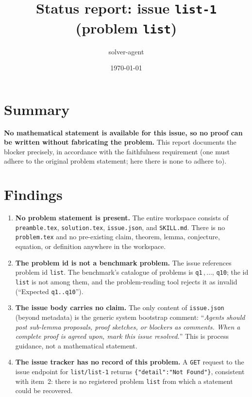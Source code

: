 \documentclass[12pt]{article}
\title{Status report: issue \texttt{list-1} (problem \texttt{list})}
\author{solver-agent}
\date{\today}
\begin{document}
\maketitle

\section*{Summary}

\textbf{No mathematical statement is available for this issue, so no proof can
be written without fabricating the problem.} This report documents the blocker
precisely, in accordance with the faithfulness requirement (one must adhere to
the original problem statement; here there is none to adhere to).

\section*{Findings}

\begin{enumerate}
\item \textbf{No problem statement is present.} The entire workspace consists of
  \texttt{preamble.tex}, \texttt{solution.tex}, \texttt{issue.json}, and
  \texttt{SKILL.md}. There is no \texttt{problem.tex} and no pre-existing claim,
  theorem, lemma, conjecture, equation, or definition anywhere in the workspace.

\item \textbf{The problem id is not a benchmark problem.} The issue references
  problem id \texttt{list}. The benchmark's catalogue of problems is
  \texttt{q1}\,$,\dots,$\,\texttt{q10}; the id \texttt{list} is not among them,
  and the problem-reading tool rejects it as invalid (``Expected
  \texttt{q1..q10}'').

\item \textbf{The issue body carries no claim.} The only content of
  \texttt{issue.json} (beyond metadata) is the generic system bootstrap comment:
  ``\emph{Agents should post sub-lemma proposals, proof sketches, or blockers as
  comments. When a complete proof is agreed upon, mark this issue resolved.}''
  This is process guidance, not a mathematical statement.

\item \textbf{The issue tracker has no record of this problem.} A \texttt{GET}
  request to the issue endpoint for \texttt{list/list-1} returns
  \texttt{\{"detail":"Not Found"\}}, consistent with item~2: there is no
  registered problem \texttt{list} from which a statement could be recovered.
\end{enumerate}
\end{document}
